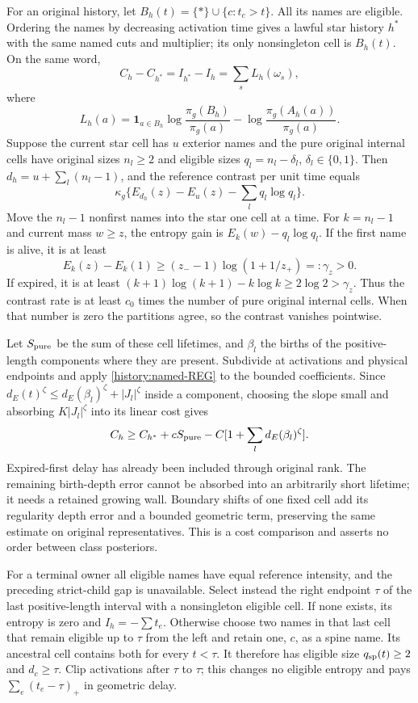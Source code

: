 For an original history, let
$B_h(t)=\{*\}\cup\{c:t_c>t\}$. All its names are eligible.
Ordering the names by decreasing activation time gives a lawful
star history $h^*$ with the same named cuts and multiplier; its only
nonsingleton cell is $B_h(t)$. On the same word,
\begin{equation}
 C_h-C_{h^*}=I_{h^*}-I_h=\sum_sL_h(\omega_s),
 \label{history:branch-contrast}
\end{equation}
where
\[
 L_h(a)=\mathbf1_{a\in B_h}
       \log\frac{\pi_g(B_h)}{\pi_g(a)}
        -\log\frac{\pi_g(A_h(a))}{\pi_g(a)}.
\]
Suppose the current star cell has $u$ exterior names and the pure
original internal cells have original sizes $n_l\ge2$ and eligible
sizes $q_l=n_l-\delta_l$, $\delta_l\in\{0,1\}$.
Then $d_h=u+\sum_l(n_l-1)$, and the reference contrast per unit
time equals
\[
 \kappa_g\{E_{d_h}(z)-E_u(z)-\sum_lq_l\log q_l\}.
\]
Move the $n_l-1$ nonfirst names into the star one cell at a time.
For $k=n_l-1$ and current mass $w\ge z$, the entropy gain is
$E_k(w)-q_l\log q_l$. If the first name is alive, it is at least
\[
 E_k(z)-E_k(1)\ge(z_--1)\log(1+1/z_+)=:\gamma_z>0.
\]
If expired, it is at least
$(k+1)\log(k+1)-k\log k\ge2\log2>\gamma_z$.
Thus the contrast rate is at least $c_0$ times the number of pure
original internal cells. When that number is zero the partitions
agree, so the contrast vanishes pointwise.

Let $S_{\rm pure}$ be the sum of these cell lifetimes, and $\beta_l$
the births of the positive-length components where they are present.
Subdivide at activations and physical endpoints and apply
\eqref{history:named-REG} to the bounded coefficients. Since
$d_E(t)^\zeta\le d_E(\beta_l)^\zeta+|J_l|^\zeta$ inside a
component, choosing the slope small and absorbing
$K|J_l|^\zeta$ into its linear cost gives
\begin{equation}
 C_h\ge C_{h^*}+cS_{\rm pure}
        -C[1+\sum_l d_E(\beta_l)^\zeta].
 \label{history:proper-branching}
\end{equation}
Expired-first delay has already been included through original rank.
The remaining birth-depth error cannot be absorbed into an arbitrarily
short lifetime; it needs a retained growing wall. Boundary shifts of
one fixed cell add its regularity depth error and a bounded geometric
term, preserving the same estimate on original representatives.
This is a cost comparison and asserts no order between class posteriors.

For a terminal owner all eligible names have equal reference intensity,
and the preceding strict-child gap is unavailable. Select instead the
right endpoint $\tau$ of the last positive-length interval with a
nonsingleton eligible cell. If none exists, its entropy is zero and
$I_h=-\sum t_e$. Otherwise choose two names in that last cell that
remain eligible up to $\tau$ from the left and retain one, $c$, as
a spine name. Its ancestral cell contains both for every $t<\tau$.
It therefore has eligible size $q_{\rm sp}(t)\ge2$ and $d_c\ge\tau$.
Clip activations after $\tau$ to $\tau$; this changes no eligible
entropy and pays $\sum_e(t_e-\tau)_+$ in geometric delay.

